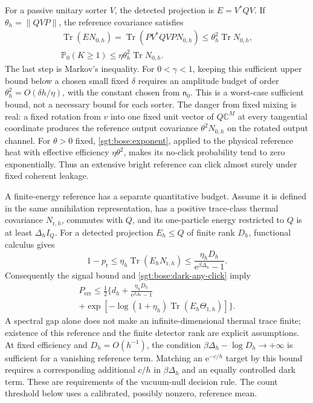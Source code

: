 \documentclass[aps,pra,reprint,superscriptaddress,longbibliography]{revtex4-2}
\newcommand{\Tr}{\operatorname{Tr}}
\newcommand{\ee}{\mathrm e}
\begin{document}
For a passive unitary sorter $V$, the detected projection is
$E=V^*QV$.  If $\theta_h=\|QVP\|$, the reference covariance satisfies
\begin{equation}
\begin{gathered}
 \Tr(EN_{0,h})=\Tr(PV^*QVPN_{0,h})
       \le\theta_h^2\Tr N_{0,h},\\
 \mathbb P_0(K\ge1)\le\eta\theta_h^2\Tr N_{0,h}.
 \label{sgt:bose:sorter-leakage}
\end{gathered}
\end{equation}
The last step is Markov's inequality.  For $0<\gamma<1$, keeping this
sufficient upper bound below a chosen small fixed $\delta$ requires
an amplitude budget of order
$\theta_h^2=O(\delta h/\eta)$, with the constant chosen from $\mathsf n_0$.
This is a worst-case sufficient bound, not a necessary bound for each
sorter.  The danger from fixed mixing is real: a fixed rotation from
$v$ into one fixed unit vector of $Q\mathbb C^M$ at every tangential
coordinate produces the reference output covariance
$\theta^2N_{0,h}$ on the rotated output channel.  For $\theta>0$ fixed,
\eqref{sgt:bose:exponent}, applied to the physical reference heat with
effective efficiency $\eta\theta^2$, makes its no-click probability
tend to zero exponentially.  Thus an extensive bright reference can
click almost surely under fixed coherent leakage.

A finite-energy reference has a separate quantitative budget.  Assume
it is defined in the same annihilation representation, has a positive
trace-class thermal covariance $N_{\mathrm r,h}$, commutes with $Q$,
and its one-particle energy restricted to $Q$ is at least
$\Delta_h I_Q$.  For a detected projection $E_h\le Q$ of finite rank
$D_h$, functional calculus gives
\begin{equation}
 1-p_{\mathrm r}\le\eta_h\Tr(E_hN_{\mathrm r,h})
   \le\frac{\eta_hD_h}{\ee^{\beta\Delta_h}-1}.
 \label{sgt:bose:reference-gap}
\end{equation}
Consequently the signal bound and \eqref{sgt:bose:dark-any-click} imply
\begin{equation}
\begin{gathered}
 P_{\mathrm{err}}
 \le\frac12\bigl\{d_h+
       \frac{\eta_hD_h}{\ee^{\beta\Delta_h}-1}
\\
       +\exp[-\log(1+\eta_h)\Tr(E_h\Theta_{1,h})]\bigr\}.
 \label{sgt:bose:reference-error}
\end{gathered}
\end{equation}
A spectral gap alone does not make an infinite-dimensional thermal
trace finite; existence of this reference and the finite detector rank
are explicit assumptions.  At fixed efficiency and $D_h=O(h^{-1})$,
the condition $\beta\Delta_h-\log D_h\to+\infty$ is sufficient for
a vanishing reference term.  Matching an $\ee^{-c/h}$ target by this
bound requires a corresponding additional $c/h$ in
$\beta\Delta_h$ and an equally controlled dark term.  These are
requirements of the vacuum-null decision rule.  The count threshold
below uses a calibrated, possibly nonzero, reference mean.
\end{document}

